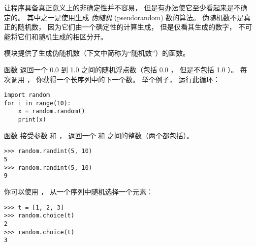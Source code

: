 让程序具备真正意义上的非确定性并不容易， 但是有办法使它至少看起来是不确定的。  
其中之一是使用生成 {\em 伪随机} (pseudorandom) 数的算法。  
伪随机数不是真正的随机数， 因为它们由一个确定性的计算生成， 
但是仅看其生成的数字， 不可能将它们和随机生成的相区分开。  



 模块提供了生成伪随机数（下文中简称为``随机数''）的函数。  



函数  返回一个 0.0 到 1.0 之间的随机浮点数（包括 0.0 ， 但是不包括 1.0 ）。    每次调用  ， 你获得一个长序列中的下一个数。  
举个例子， 运行此循环：

\begin{lstlisting}
import random
for i in range(10):
    x = random.random()
    print(x)
\end{lstlisting}


函数  接受参数  和  ， 
返回一个  和  之间的整数（两个都包括）。  


\begin{lstlisting}
>>> random.randint(5, 10)
5
>>> random.randint(5, 10)
9
\end{lstlisting}


你可以使用  ， 从一个序列中随机选择一个元素：


\begin{lstlisting}
>>> t = [1, 2, 3]
>>> random.choice(t)
2
>>> random.choice(t)
3
\end{lstlisting}

